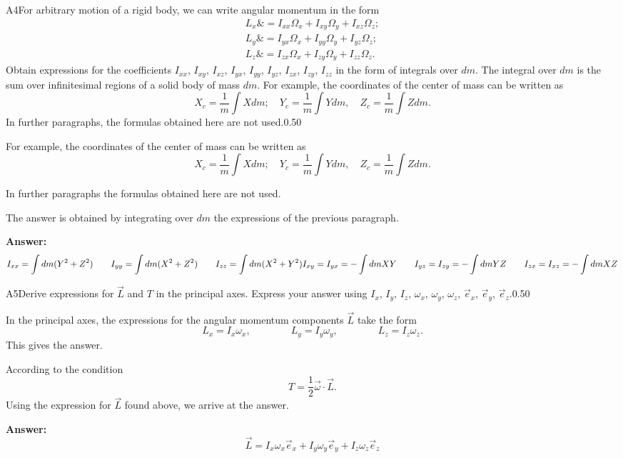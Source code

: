\documentclass[11pt,a4paper]{article}
\begin{document}
\begin{solcard}{A4}{For arbitrary motion of a rigid body, we can write angular momentum in the form \begin{align*} L_x \&= I_{xx} \Omega_x+ I_{xy} \Omega_y + I_{xz} \Omega_z;\\ L_y \&= I_{yx} \Omega_x + I_{yy} \Omega_y + I_{yz} \Omega_z;\\ L_z \&= I_{zx} \Omega_x + I_{zy} \Omega_y + I_{zz} \Omega_z. \end{align*} Obtain expressions for the coefficients $I_{xx}$, $I_{xy}$, $I_{xz}$, $I_{yx}$, $I_{yy}$, $I_{yz}$, $I_{zx}$, $I_{zy}$, $I_{zz}$  in the form of integrals over $dm$. The integral over $dm$ is the sum over infinitesimal regions of a solid body of mass $dm$. For example, the coordinates of the center of mass can be written as $$X_c = \frac{1}{m} \int X dm; \quad Y_c = \frac{1}{m} \int Y dm, \quad   Z_c = \frac{1}{m} \int Z dm. $$ In further paragraphs, the formulas obtained here are not used.}{0.50}

For example, the coordinates of the center of mass can be written as $$X_c = \frac{1}{m} \int X dm; \quad Y_c = \frac{1}{m} \int Y dm, \quad   Z_c = \frac{1}{m} \int Z dm. $$


In further paragraphs the formulas obtained here are not used.


The answer is obtained by integrating over $dm$ the expressions of the previous paragraph.

\par\smallskip\noindent\textbf{Answer:} $$ I_{xx} = \int{dm(Y^2 + Z^2)} \qquad I_{yy} = \int{dm(X^2 + Z^2)} \qquad I_{zz} = \int{dm(X^2 + Y^2)} \\ I_{xy} = I_{yx} = -\int{dmXY} \qquad I_{yz} = I_{zy} = -\int{dmYZ} \qquad I_{zx} = I_{xz} = -\int{dmXZ} $$
\end{solcard}

\begin{solcard}{A5}{Derive expressions for $\vec{L}$ and $T$ in the principal axes. Express your answer using $I_x$, $I_y$, $I_z$, $\omega_x$, $\omega_y$, $\omega_z$, $\vec{e}_x$, $\vec{e}_y$, $\vec{e}_z$.}{0.50}

In the principal axes, the expressions for the angular momentum components $\vec{L}$ take the form $$L_x = I_x \omega_x, \qquad \qquad L_y = I_y \omega_y, \qquad \qquad L_z = I_z \omega_z.$$This gives the answer.


According to the condition $$T = \frac{1}{2} \vec\omega \cdot \vec{L}.$$Using the expression for $\vec L$ found above, we arrive at the answer.

\par\smallskip\noindent\textbf{Answer:} $$ \vec{L} = I_x \omega_x \vec{e}_x + I_y \omega_y \vec{e}_y +  I_z \omega_z \vec{e}_z $$
\end{solcard}
\end{document}
